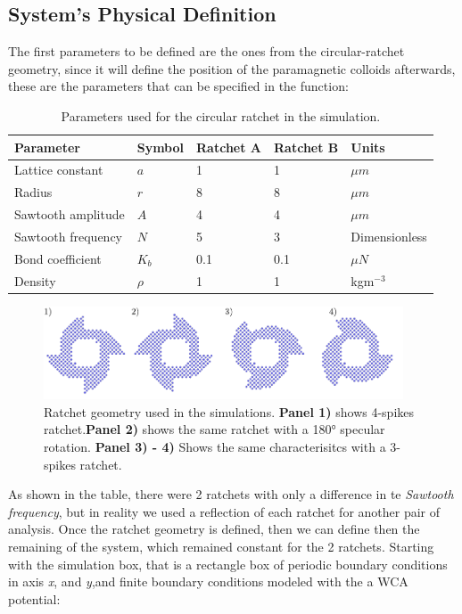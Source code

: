 \subsection{System's Physical Definition}

The first parameters to be defined are the ones from the circular-ratchet geometry, since it will define the position of the paramagnetic colloids afterwards, these are the parameters that can be specified in the function:

\begin{table}[H]
\centering
\caption[Ratchet physical parameters.]{Parameters used for the circular ratchet in the simulation.}
\begin{tabular}{l l l l l}
\hline
Parameter & Symbol & Ratchet A & Ratchet B & Units \\
\hline
Lattice constant & \(a\) & 1 & 1 & \(\mu m\) \\
Radius & \( r\) & 8 & 8 & \( \mu m\) \\
Sawtooth amplitude & \( A\) & 4 & 4 & \( \mu m\) \\
Sawtooth frequency & \( N\) & 5 & 3 & Dimensionless\\
Bond coefficient & \( K_b\) & 0.1 & 0.1 & \( \mu N\) \\ 
Density & \(\rho\) & 1 & 1 & kgm\(^{-3}\) \\
\hline
\end{tabular}
\end{table}

\begin{figure}
  \begin{center}
    \includegraphics[width=0.95\textwidth]{figures/ratchet.pdf}
  \end{center}
  \caption[Ratchet geomety.]{Ratchet geometry used in the simulations. \textbf{Panel 1)} shows 4-spikes ratchet.\textbf{Panel 2)} shows the same ratchet with a 180° specular rotation. \textbf{Panel 3) - 4)} Shows the same characterisitcs with a 3-spikes ratchet.}\label{fig:ratchetgeometry}
\end{figure}


As shown in the table, there were 2 ratchets with only a difference in te \textit{Sawtooth frequency}, but in reality we used a reflection of each ratchet for another pair of analysis. Once the ratchet geometry is defined, then we can define then the remaining of the system, which remained constant for the 2 ratchets. Starting with the simulation box, that is a rectangle box of periodic boundary conditions in axis \textit{x}, and \textit{y},and finite boundary conditions modeled with the a WCA potential:




